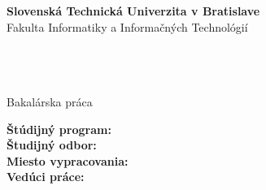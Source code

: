 \begin{center}
\thispagestyle{empty}


{\Large \bf Slovenská Technická Univerzita v Bratislave}\\[\baselineskip]
{\large Fakulta Informatiky a Informačných Technológií}

\noindent\makebox[\linewidth]{\rule{\textwidth}{1pt}} 


\hspace{0.5cm}

{\large \bf \FIIT}\\
\vspace*{4.5cm}
{\Large \Author}\\[\baselineskip]
{\huge \bf \Titlesk}\\[\baselineskip]
{\large Bakalárska práca}\\

\end{center}
\vspace{4.0cm}
{\bf Štúdijný program:} \Programsk\\ 
{\bf Študijný odbor:} \Fieldsk\\
{\bf Miesto vypracovania:} \Placesk\\
{\bf Vedúci práce:} \Supervisor \\ \\
\Monthsk    \Year